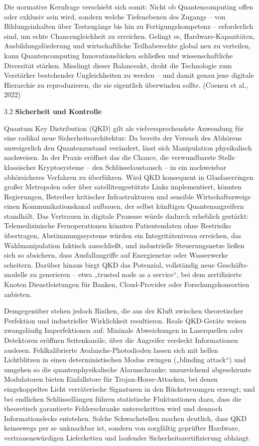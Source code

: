 Die normative Kernfrage verschiebt sich somit: Nicht ob Quantencomputing offen oder exklusiv sein wird, sondern welche Tiefenebenen des Zugangs – von Bildungsinhalten über Testzugänge bis hin zu Fertigungskompetenz – erforderlich sind, um echte Chancengleichheit zu erreichen. Gelingt es, Hardware-Kapazitäten, Ausbildungsförderung und wirtschaftliche Teilhaberechte global neu zu verteilen, kann Quantencomputing Innovationslücken schließen und wissenschaftliche Diversität stärken. Misslingt dieser Balanceakt, droht die Technologie zum Verstärker bestehender Ungleichheiten zu werden – und damit genau jene digitale Hierarchie zu reproduzieren, die sie eigentlich überwinden sollte. (Coenen et al., 2022)

3.2 \textbf{Sicherheit und Kontrolle}

Quantum Key Distribution (QKD) gilt als vielversprechendste Anwendung für eine radikal neue Sicherheits­­architektur: Da bereits der Versuch des Abhörens unweigerlich den Quantenzustand verändert, lässt sich Manipulation physikalisch nachweisen. In der Praxis eröffnet das die Chance, die verwundbarste Stelle klassischer Kryptosysteme – den Schlüsselaustausch – in ein nachweisbar abhörsicheres Verfahren zu überführen. Wird QKD konsequent in Glasfaserringen großer Metropolen oder über satellitengestützte Links implementiert, könnten Regierungen, Betreiber kritischer Infrastrukturen und sensible Wirtschafts­­zweige einen Kommunikations­­kanal aufbauen, der selbst künftigen Quanten­­angreifern standhält. Das Vertrauen in digitale Prozesse würde dadurch erheblich gestärkt: Telemedizinische Fern­operationen könnten Patientendaten ohne Restrisiko übertragen, Abstimmungssysteme würden ein Integritäts­niveau erreichen, das Wahlmanipulation faktisch ausschließt, und industrielle Steuerungsnetze ließen sich so absichern, dass Ausfall­angriffe auf Energienetze oder Wasserwerke scheitern. Darüber hinaus birgt QKD das Potenzial, vollständig neue Geschäfts­modelle zu generieren – etwa „trusted node as a service“, bei dem zertifizierte Knoten Dienstleistungen für Banken, Cloud-Provider oder Forschungskonsortien anbieten.

Demgegenüber stehen jedoch Risiken, die aus der Kluft zwischen theoretischer Perfektion und industrieller Wirklichkeit resultieren. Reale QKD-Geräte weisen zwangsläufig Imperfektionen auf: Mininale Abweichungen in Laserquellen oder Detektoren eröffnen Seitenkanäle, über die Angreifer verdeckt Informationen auslesen. Fehlkalibrierte Avalanche-Photodioden lassen sich mit hellen Lichtblitzen in einen deterministischen Modus zwingen („blinding attack“) und umgehen so die quanten­­physikalische Alarm­schranke; unzureichend abgeschirmte Modulatoren bieten Einfallstore für Trojan-Horse-Attacken, bei denen eingekoppeltes Licht verräterische Signaturen in den Rückstreuungen erzeugt; und bei endlichen Schlüssellängen führen statistische Fluktuationen dazu, dass die theoretisch garantierte Fehlerschranke unterschritten wird und dennoch Informationslecks entstehen. Solche Schwachstellen machen deutlich, dass QKD keineswegs per se unknackbar ist, sondern von sorgfältig geprüfter Hardware, vertrauens­­wür­digen Lieferketten und laufender Sicherheits­­zertifizierung abhängt.

